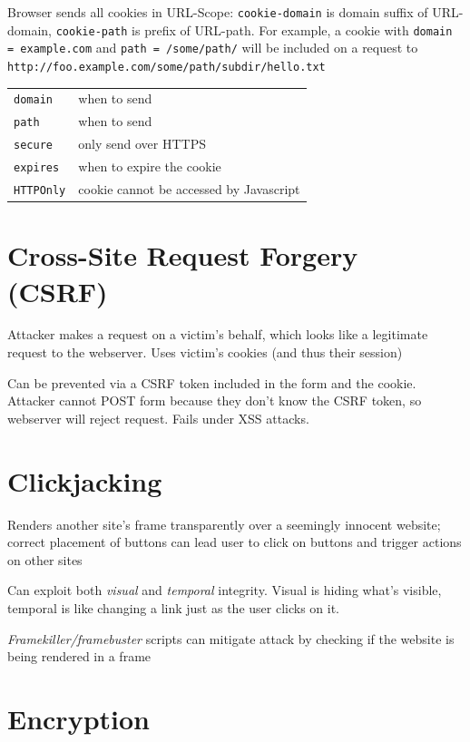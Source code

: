 \documentclass[10pt,landscape]{article}
\begin{document}
\begin{multicols}{3}
Browser sends all cookies in URL-Scope: \texttt{cookie-domain} is domain suffix of URL-domain, \texttt{cookie-path} is prefix of URL-path. For example, a cookie with
\texttt{domain = example.com} and \texttt{path = /some/path/} will be included on a request to \texttt{http://foo.example.com/some/path/subdir/hello.txt}

\begin{tabular}{@{}ll@{}}
\texttt{domain}     & when to send \\
\texttt{path}       & when to send \\
\texttt{secure}     & only send over HTTPS \\
\texttt{expires}    & when to expire the cookie \\
\texttt{HTTPOnly}   & cookie cannot be accessed by Javascript \\
\end{tabular}


\section{Cross-Site Request Forgery (CSRF)}

Attacker makes a request on a victim's behalf, which looks like a legitimate request to the webserver. Uses victim's cookies (and thus their session)

Can be prevented via a CSRF token included in the form and the cookie. Attacker cannot POST form because they don't know the CSRF token, so webserver will reject request. Fails under XSS attacks.

\section{Clickjacking}

Renders another site's frame transparently over a seemingly innocent website; correct placement of buttons can lead user to click on buttons and trigger actions on other sites

Can exploit both \textit{visual} and \textit{temporal} integrity. Visual is hiding what's visible, temporal is like changing a link just as the user clicks on it.

\textit{Framekiller/framebuster} scripts can mitigate attack by checking if the website is being rendered in a frame


\section{Encryption}


\end{multicols}
\end{document}
